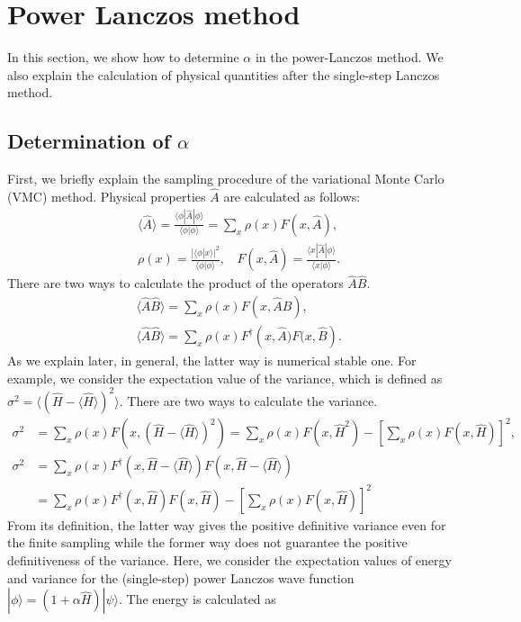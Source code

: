 \section{Power Lanczos method}

In this section, we show how to determine $\alpha$ in the power-Lanczos method. 
We also explain the calculation of physical quantities after the single-step Lanczos method.
\subsection{Determination of $\alpha$}
First, we briefly explain the sampling procedure of the variational Monte Carlo (VMC) method.
Physical properties $\hat{A}$ are calculated as follows:
\begin{align}
&\langle \hat{A}\rangle = \frac{\langle \phi| \hat{A}|\phi \rangle}{\langle \phi| \phi \rangle} = \sum_{x} \rho(x) F(x, {\hat{A}}),\\
& \rho(x)=\frac{|\langle \phi|x\rangle|^2}{\langle \phi | \phi \rangle}, ~~~~F(x,  {\hat{A}}) =  \frac{\langle x| \hat{A}|\phi \rangle}{\langle x| \phi \rangle}.
\end{align}
There are two ways to calculate the product of the operators  $\hat{A}\hat{B}$.
\begin{align}
&\langle \hat{A} \hat{B}\rangle = \sum_{x} \rho(x) F(x, {\hat{A}\hat{B}}),\\
&\langle \hat{A} \hat{B}\rangle = \sum_{x} \rho(x) F^{\dag}(x, {\hat{A})F(x, \hat{B}}).
\end{align}
As we explain later, in general, the latter way is numerical stable one. 
For example, we consider the expectation value of the variance, 
which is defined as $\sigma^2=\langle (\hat{H}-\langle \hat{H}\rangle)^2\rangle$. There are two ways to calculate the variance.
\begin{align}
\sigma^2&=\sum_{x} \rho(x) F(x,  (\hat{H}-\langle \hat{H}\rangle)^2) = \sum_{x} \rho(x) F(x,  \hat{H}^2) - \left[ \sum_{x} \rho(x) F(x,  \hat{H})\right]^2 ,\\
\sigma^2&=\sum_{x} \rho(x) F^{\dag}(x,  \hat{H}-\langle \hat{H}\rangle)F(x,  \hat{H}-\langle \hat{H}\rangle) \nonumber \\
&= \sum_{x} \rho(x) F^{\dag}(x,  \hat{H}) F(x, \hat{H})- \left[ \sum_{x} \rho(x) F(x,  \hat{H})\right]^2 
\end{align}
From its definition, the latter way gives the positive definitive variance even for the finite sampling while the former way does not guarantee the positive definitiveness of the variance. Here, we consider the expectation values of energy and variance for the (single-step) power Lanczos wave function $|\phi\rangle =(1+\alpha \hat{H}) |\psi \rangle$. The energy is calculated as
